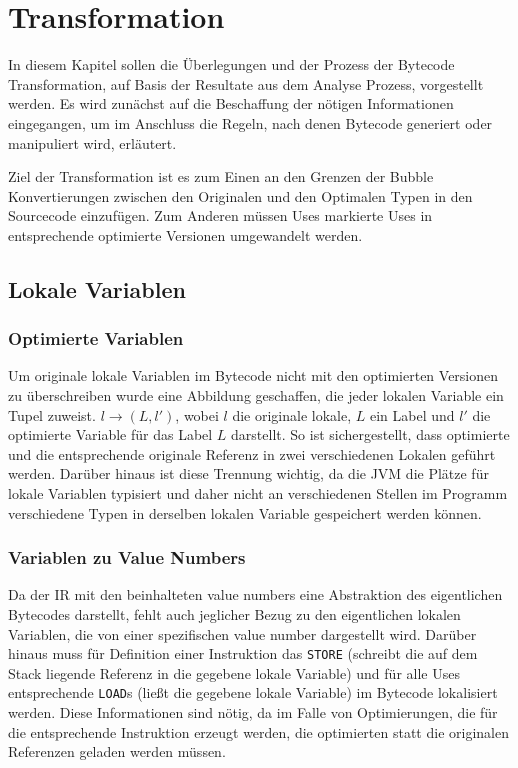 \chapter{Transformation}
\label{ch:trans}

In diesem Kapitel sollen die Überlegungen und der Prozess der Bytecode Transformation,
auf Basis der Resultate aus dem Analyse Prozess, vorgestellt werden. Es wird zunächst 
auf die Beschaffung der nötigen Informationen eingegangen, um im Anschluss die Regeln,
nach denen Bytecode generiert oder manipuliert wird, erläutert.

Ziel der Transformation ist es zum Einen an den Grenzen der Bubble Konvertierungen zwischen den
Originalen und den Optimalen Typen in den Sourcecode einzufügen. Zum Anderen müssen Uses
markierte Uses in entsprechende optimierte Versionen umgewandelt werden.  

\section{Lokale Variablen}
\label{sec:locals}

\subsection{Optimierte Variablen}

Um originale lokale Variablen im Bytecode nicht mit den optimierten Versionen zu 
überschreiben wurde eine Abbildung geschaffen, die jeder lokalen Variable ein Tupel 
zuweist. $l \rightarrow (L,l')$, wobei $l$ die originale lokale, $L$ ein Label und 
$l'$ die optimierte Variable für das Label $L$ darstellt. So ist sichergestellt, dass
optimierte und die entsprechende originale Referenz in zwei verschiedenen Lokalen 
geführt werden. Darüber hinaus ist diese Trennung wichtig, da die JVM die Plätze für
lokale Variablen typisiert und daher nicht an verschiedenen Stellen im Programm 
verschiedene Typen in derselben lokalen Variable gespeichert werden können.

\subsection{Variablen zu Value Numbers}

Da der IR mit den beinhalteten value numbers eine Abstraktion des eigentlichen Bytecodes
darstellt, fehlt auch jeglicher Bezug zu den eigentlichen lokalen Variablen, die von
einer spezifischen value number dargestellt wird. Darüber hinaus muss für Definition
einer Instruktion das \texttt{STORE} (schreibt die auf dem Stack liegende Referenz in 
die gegebene lokale Variable) und für alle Uses entsprechende \texttt{LOAD}s (ließt die 
gegebene lokale Variable) im Bytecode lokalisiert werden. Diese Informationen sind nötig,
da im Falle von Optimierungen, die für die entsprechende Instruktion erzeugt werden, 
die optimierten statt die originalen Referenzen geladen werden müssen.

